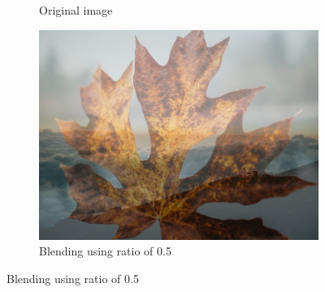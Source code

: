 \documentclass{article}
\begin{document}
\begin{itemize}
\begin{figure}[h]
\begin{subfigure}{.45\textwidth}
        \caption{Original image}
      \end{subfigure}
      \hspace{1cm}
      \begin{subfigure}{.45\textwidth}
        \includegraphics[width=\linewidth]{./result/labwork6c-gpu-out.jpg}
        \caption{Blending using ratio of 0.5}
      \end{subfigure}
    \end{figure}
\end{itemize}
\end{document}
